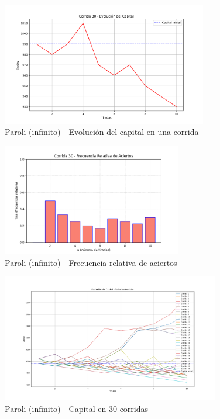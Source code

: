 \documentclass{article}
\begin{document}
\begin{figure}[H]
    \centering
    \includegraphics[width=0.8\textwidth]{./images/capital_corrida_30_p_i.png}
    \caption{Paroli (infinito) - Evolución del capital en una corrida}
\end{figure}

\begin{figure}[H]
    \centering
    \includegraphics[width=0.7\textwidth]{./images/frsa_corrida_30_p_f.png}
    \caption{Paroli (infinito) - Frecuencia relativa de aciertos}
\end{figure}

\begin{figure}[H]
    \centering
    \includegraphics[width=0.85\textwidth]{./images/capital_todas_corridas_p_i.png}
    \caption{Paroli (infinito) - Capital en 30 corridas}
\end{figure}
\end{document}
